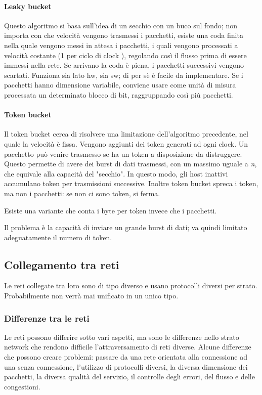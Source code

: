 \paragraph{Leaky bucket}
Questo algoritmo si basa sull'idea di un secchio con un buco sul fondo;
non importa con che velocità vengono trasmessi i pacchetti, esiste una coda finita nella quale vengono messi in attesa i pacchetti, i quali vengono processati a velocità costante (1 per ciclo di clock	), regolando così il flusso prima di essere immessi nella rete.
Se arrivano la coda è piena, i pacchetti successivi vengono scartati.
Funziona sia lato hw, sia sw; di per sè è facile da implementare.
Se i pacchetti hanno dimensione variabile, conviene usare come unità di misura processata un determinato blocco di bit, raggruppando così più pacchetti.

\paragraph{Token bucket}
Il token bucket cerca di risolvere una limitazione dell'algoritmo precedente, nel quale la velocità è fissa.
Vengono aggiunti dei token generati ad ogni clock.
Un pacchetto può venire trasmesso se ha un token a disposizione da distruggere.
Questo permette di avere dei burst di dati trasmessi, con un massimo uguale a \textit{n}, che equivale alla capacità del "secchio".
In questo modo, gli host inattivi accumulano token per trasmissioni successive.
Inoltre token bucket spreca i token, ma non i pacchetti: se non ci sono token, si ferma.

Esiste una variante che conta i byte per token invece che i pacchetti.

Il problema è la capacità di inviare un grande burst di dati; va quindi limitato adeguatamente il numero di token.

\subsection{Collegamento tra reti} %
Le reti collegate tra loro sono di tipo diverso e usano protocolli diversi per strato.
Probabilmente non verrà mai unificato in un unico tipo.

\subsubsection{Differenze tra le reti}
Le reti possono differire sotto vari aspetti, ma sono le differenze nello strato network che rendono difficile l'attraversamento di reti diverse.
Alcune differenze che possono creare problemi:
passare da una rete orientata alla connessione ad una senza connessione,
l'utilizzo di protocolli diversi, la diversa dimensione dei pacchetti, la diversa qualità del servizio, 
il controlle degli errori, del flusso e delle congestioni.

